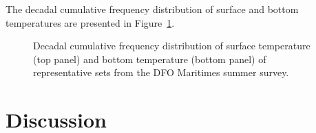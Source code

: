 \documentclass[12pt]{article}\usepackage[]{graphicx}\usepackage[]{color}
\begin{document}
The decadal cumulative frequency distribution of surface and bottom temperatures are presented in Figure~\ref{fig:setsdistdecadal}.


\begin{figure}[htb]

{\centering {} 

}

\caption{Decadal cumulative frequency distribution of surface temperature (top panel) and bottom temperature (bottom panel) of representative sets from the DFO Maritimes summer survey.}\label{fig:setsdistdecadal}
\end{figure}
\hypertarget{discussion}{%
\section{Discussion}\label{discussion}}
\end{document}
